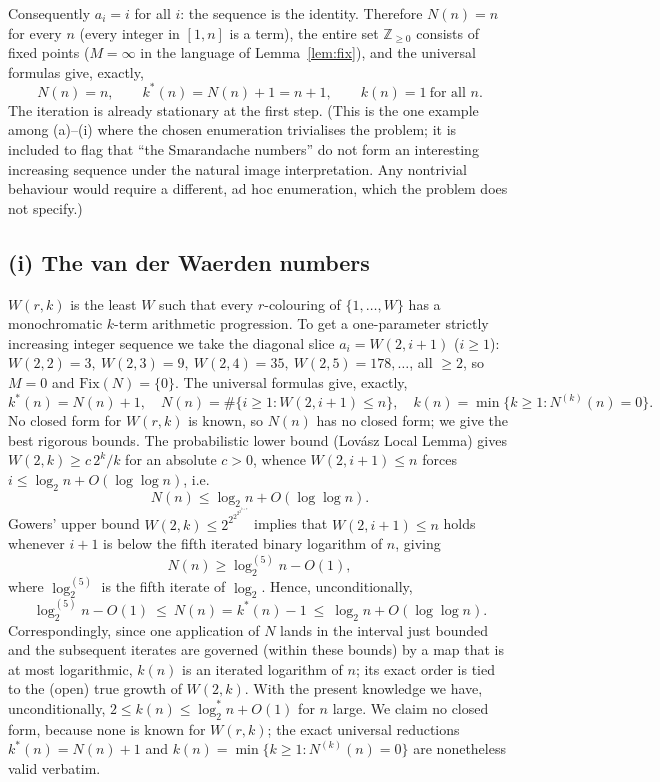 \documentclass[12pt]{article}
\theoremstyle{definition}
\begin{document}
Consequently $a_i=i$ for all $i$: the sequence is the identity. Therefore $N(n)=n$ for
every $n$ (every integer in $[1,n]$ is a term), the entire set $\mathbb Z_{\ge0}$
consists of fixed points ($M=\infty$ in the language of Lemma~\ref{lem:fix}), and the
universal formulas give, exactly,
\[
  N(n)=n,\qquad k^*(n)=N(n)+1=n+1,\qquad k(n)=1\ \text{for all }n .
\]
The iteration is already stationary at the first step. (This is the one example among
(a)--(i) where the chosen enumeration trivialises the problem; it is included to
flag that ``the Smarandache numbers'' do not form an interesting increasing sequence
under the natural image interpretation. Any nontrivial behaviour would require a
different, ad hoc enumeration, which the problem does not specify.)

\subsection{(i) The van der Waerden numbers}
$W(r,k)$ is the least $W$ such that every $r$-colouring of $\{1,\dots,W\}$ has a
monochromatic $k$-term arithmetic progression. To get a one-parameter strictly
increasing integer sequence we take the diagonal slice $a_i=W(2,i+1)$ ($i\ge1$):
$W(2,2)=3,\ W(2,3)=9,\ W(2,4)=35,\ W(2,5)=178,\dots$, all $\ge2$, so $M=0$ and
$\mathrm{Fix}(N)=\{0\}$. The universal formulas give, exactly,
\[
  k^*(n)=N(n)+1,\quad N(n)=\#\{i\ge1:W(2,i+1)\le n\},\quad
  k(n)=\min\{k\ge1:N^{(k)}(n)=0\}.
\]
No closed form for $W(r,k)$ is known, so $N(n)$ has no closed form; we give the best
rigorous bounds. The probabilistic lower bound (Lovász Local Lemma) gives
$W(2,k)\ge c\,2^{k}/k$ for an absolute $c>0$, whence $W(2,i+1)\le n$ forces
$i\le\log_2 n+O(\log\log n)$, i.e.
\[
  N(n)\le\log_2 n+O(\log\log n).
\]
Gowers' upper bound $W(2,k)\le 2^{2^{2^{2^{2^{\,k+9}}}}}$ implies that $W(2,i+1)\le n$
holds whenever $i+1$ is below the fifth iterated binary logarithm of $n$, giving
\[
  N(n)\ge\log^{(5)}_2 n-O(1),
\]
where $\log^{(5)}_2$ is the fifth iterate of $\log_2$. Hence, unconditionally,
\[
  \log^{(5)}_2 n-O(1)\ \le\ N(n)=k^*(n)-1\ \le\ \log_2 n+O(\log\log n).
\]
Correspondingly, since one application of $N$ lands in the interval just bounded and
the subsequent iterates are governed (within these bounds) by a map that is at most
logarithmic, $k(n)$ is an iterated logarithm of $n$; its exact order is tied to the
(open) true growth of $W(2,k)$. With the present knowledge we have, unconditionally,
$2\le k(n)\le \log^*_2 n+O(1)$ for $n$ large. We claim no closed form, because none is
known for $W(r,k)$; the exact universal reductions $k^*(n)=N(n)+1$ and
$k(n)=\min\{k\ge1:N^{(k)}(n)=0\}$ are nonetheless valid verbatim.
\end{document}
